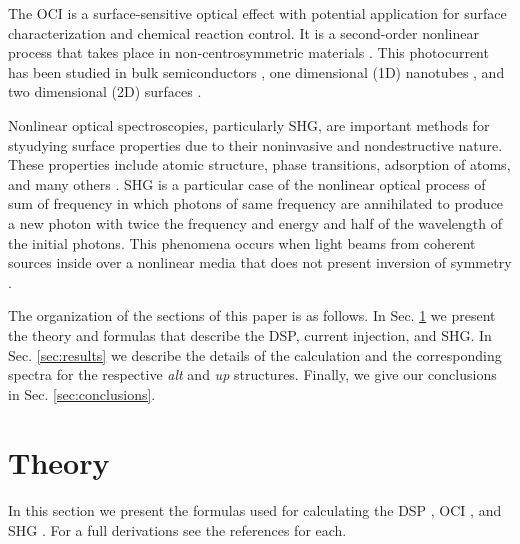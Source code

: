 \documentclass[pss]{wiley2sp} %
\begin{document}
The OCI is a surface-sensitive optical effect with potential application for surface characterization and chemical reaction control. It is a second-order nonlinear process that takes place in non-centrosymmetric materials \cite{nastos2006optical,cabellos2011optical,bhat2005excitonic,fraser1999quantum}. This photocurrent has been studied in bulk semiconductors \cite{atanasov1996coherent,sipe2000second}, one dimensional (1D) nanotubes \cite{mele2000coherent,kral2000photogalvanic}, and two dimensional (2D) surfaces \cite{mele2000coherent,cabellos2011optical}.

Nonlinear optical spectroscopies, particularly SHG, are important methods for
styudying surface properties due to their noninvasive and nondestructive
nature. These properties include atomic structure, phase transitions,
adsorption of atoms, and many others \cite{dadap1997second,%
daum1993identification,mcgilp1994probing,power1995resonant,%
godefroy1996electric,salazar2014molecular,chen1981surface,%
mendoza1998microscopic}. 
SHG is a particular case of the nonlinear optical process of sum of frequency in which photons of same frequency are annihilated to produce a new photon with twice the frequency and energy and half of the wavelength of the initial photons. This phenomena occurs when light beams from coherent sources inside over a nonlinear media that does not present inversion of symmetry \cite{bloembergen1962light,andersonPRB15,sipe2000second}.

The organization of the sections of this paper is as follows. In Sec.
\ref{sec:theory} we present the theory and formulas that describe the DSP,
current injection, and SHG. In Sec. \ref{sec:results} we describe the details
of the calculation and the corresponding spectra for the respective \emph{alt}
and \emph{up} structures. Finally, we give our conclusions in Sec.
\ref{sec:conclusions}.


\section{Theory}\label{sec:theory}

\begin{changed}
In this section we present the formulas used for calculating the DSP \cite{nastos2007full,mendoza2012optical}, OCI \cite{cabellos2011optical,sipe2000second}, and SHG \cite{andersonPRB15}. For a full derivations see the references for each.
\end{changed}
\end{document}
